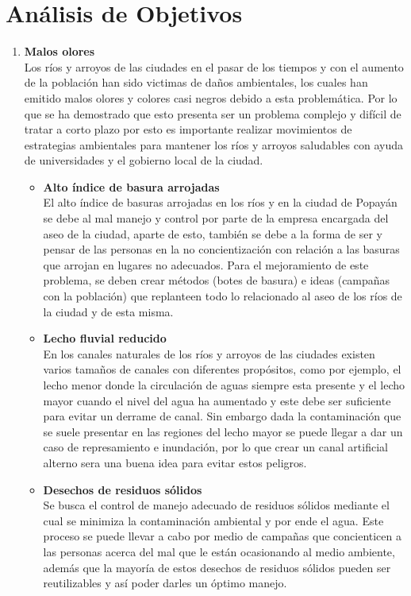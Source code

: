 \section{Análisis de Objetivos}


\begin{enumerate}
	\item \textbf{Malos olores}\\
	      Los ríos y arroyos de las ciudades en el pasar de los tiempos y con el aumento de la población han sido victimas de daños ambientales, los cuales han emitido malos olores y colores casi negros debido a esta problemática. Por lo que se ha demostrado que esto presenta ser un problema complejo y difícil de tratar a corto plazo por esto es importante realizar movimientos de estrategias ambientales para mantener los ríos y arroyos saludables con ayuda de universidades y el gobierno local de la ciudad.
	      \begin{itemize}
		      \item \textbf{Alto índice de basura arrojadas}\\
		            El alto índice de basuras arrojadas en los ríos y en la ciudad de Popayán se debe al mal manejo y control por parte de la empresa encargada del aseo de la ciudad, aparte de esto, también se debe a la forma de ser y pensar de las personas en la no concientización con relación a las basuras que arrojan en lugares no adecuados. Para el mejoramiento de este problema, se deben crear métodos (botes de basura) e ideas (campañas con la población) que replanteen todo lo relacionado al aseo de los ríos de la ciudad y de esta misma.

		      \item \textbf{Lecho fluvial reducido} \\
		            En los canales naturales de los ríos y arroyos de las ciudades existen varios tamaños de canales con diferentes propósitos, como por ejemplo, el lecho menor donde la circulación de aguas siempre esta presente y el lecho mayor cuando el nivel del agua ha aumentado y este debe ser suficiente para evitar un derrame de canal. Sin embargo dada la contaminación que se suele presentar en las regiones del lecho mayor se puede llegar a dar un caso de represamiento e inundación, por lo que crear un canal artificial alterno sera una buena idea para evitar estos peligros.
		      \item \textbf{Desechos de residuos sólidos}\\
		            Se busca el control de manejo adecuado de residuos sólidos mediante el cual se minimiza la contaminación ambiental y por ende el agua. Este proceso se puede llevar a cabo por medio de campañas que concienticen a las personas acerca del mal que le están ocasionando al medio ambiente, además que la mayoría de estos desechos de residuos sólidos pueden ser reutilizables y así poder darles un óptimo manejo.


\end{itemize}
\end{enumerate}
